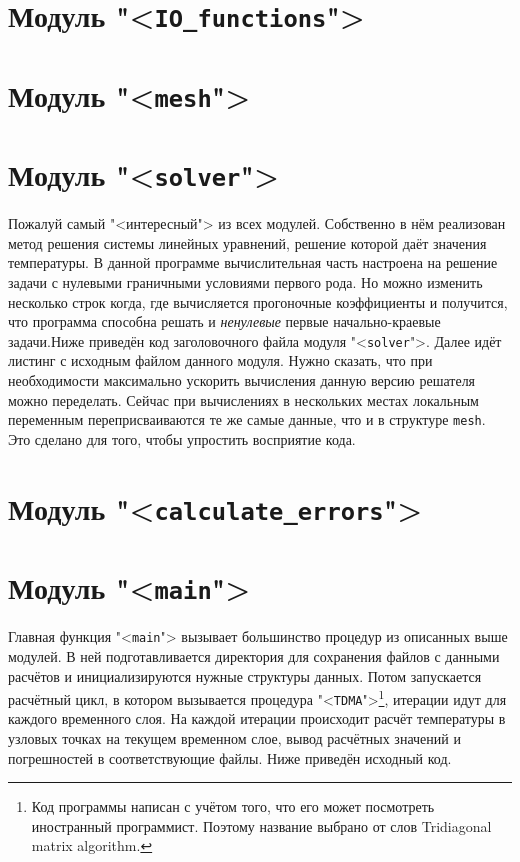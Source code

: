 \documentclass[oneside, final, 14pt]{report}
\begin{document}
\section{Модуль "<\texttt{IO\_functions}">}
\large
{}
\Large
\section{Модуль "<\texttt{mesh}">}
\large 
{}
\Large
\section{Модуль "<\texttt{solver}">}
Пожалуй самый "<интересный"> из всех модулей. Собственно в нём реализован метод решения системы линейных уравнений, решение которой даёт значения температуры. В данной программе вычислительная часть настроена на решение задачи с нулевыми граничными условиями первого рода. Но можно изменить несколько строк когда, где вычисляется прогоночные коэффициенты и получится, что программа способна решать и \emph{ненулевые} первые начально-краевые задачи.Ниже приведён код заголовочного файла модуля "<\texttt{solver}">.
\large 
{}
\Large 
Далее идёт листинг с исходным файлом данного модуля. Нужно сказать, что при необходимости максимально ускорить вычисления данную версию решателя можно переделать. Сейчас при вычислениях в нескольких местах локальным переменным переприсваиваются те же самые данные, что и в структуре \texttt{mesh}. Это сделано для того, чтобы упростить восприятие кода. 
\large
{}
\Large
\section{Модуль "<\texttt{calculate\_errors}">}
\large
{}
\Large
\section{Модуль "<\texttt{main}">}
Главная функция "<\texttt{main}"> вызывает большинство процедур из описанных выше модулей. В ней подготавливается директория для сохранения файлов с данными расчётов и инициализируются нужные структуры данных. Потом запускается расчётный цикл, в котором вызывается процедура "<\texttt{TDMA}">\footnote{Код программы написан с учётом того, что его может посмотреть иностранный программист. Поэтому название выбрано от слов Tridiagonal matrix algorithm.}, итерации идут для каждого временного слоя. На каждой итерации происходит расчёт температуры в узловых точках на текущем временном слое, вывод расчётных значений и погрешностей в соответствующие файлы. Ниже приведён исходный код.
\large
{}
\Large
\end{document}
